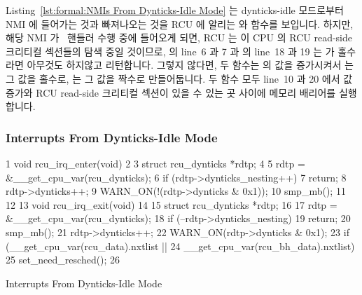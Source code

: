 Listing~\ref{lst:formal:NMIs From Dynticks-Idle Mode}
는 dynticks-idle 모드로부터 NMI 에 들어가는 것과 빠져나오는 것을 RCU 에 알리는
 와  함수를 보입니다.
하지만, 해당 NMI 가 \IRQ\ 핸들러 수행 중에 들어오게 되면, RCU 는 이 CPU 의 RCU
read-side 크리티컬 섹션들의 탐색 중일 것이므로,  의 line~6
과 7 과  의 line~18 과 19 는  가 홀수라면
아무것도 하지않고 리턴합니다.
그렇지 않다면, 두 함수는  의 값을 증가시켜서
 는 그 값을 홀수로,  는 그 값을 짝수로
만들어둡니다.
두 함수 모두 line~10 과 20 에서 값 증가와 RCU read-side 크리티컬 섹션이 있을 수
있는 곳 사이에 메모리 배리어를 실행합니다.
\iffalse

Listing~\ref{lst:formal:NMIs From Dynticks-Idle Mode}
shows the \co{rcu_nmi_enter()} and \co{rcu_nmi_exit()} functions,
which inform RCU of NMI entry and exit, respectively, from dynticks-idle
mode.
However, if the NMI arrives during an \IRQ\ handler, then RCU will already
be on the lookout for RCU read-side critical sections from this CPU,
so lines~6 and~7 of \co{rcu_nmi_enter()} and lines~18 and~19
of \co{rcu_nmi_exit()} silently return if \co{dynticks} is odd.
Otherwise, the two functions increment \co{dynticks_nmi}, with
\co{rcu_nmi_enter()} leaving it with an odd value and \co{rcu_nmi_exit()}
leaving it with an even value.
Both functions execute memory barriers between this increment
and possible RCU read-side critical sections on lines~10 and~20,
respectively.
\fi

\subsubsection{Interrupts From Dynticks-Idle Mode}
\label{sec:formal:Interrupts From Dynticks-Idle Mode}

\begin{listing}[tbp]
{ \scriptsize
\begin{verbbox}
  1 void rcu_irq_enter(void)
  2 {
  3   struct rcu_dynticks *rdtp;
  4
  5   rdtp = &__get_cpu_var(rcu_dynticks);
  6   if (rdtp->dynticks_nesting++)
  7     return;
  8   rdtp->dynticks++;
  9   WARN_ON(!(rdtp->dynticks & 0x1));
 10   smp_mb();
 11 }
 12
 13 void rcu_irq_exit(void)
 14 {
 15   struct rcu_dynticks *rdtp;
 16
 17   rdtp = &__get_cpu_var(rcu_dynticks);
 18   if (--rdtp->dynticks_nesting)
 19     return;
 20   smp_mb();
 21   rdtp->dynticks++;
 22   WARN_ON(rdtp->dynticks & 0x1);
 23   if (__get_cpu_var(rcu_data).nxtlist ||
 24       __get_cpu_var(rcu_bh_data).nxtlist)
 25     set_need_resched();
 26 }
\end{verbbox}
}
\centering
\theverbbox
\caption{Interrupts From Dynticks-Idle Mode}
\label{lst:formal:Interrupts From Dynticks-Idle Mode}
\end{listing}

